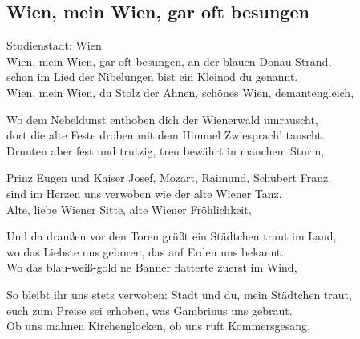 
\subsection*{Wien, mein Wien, gar oft besungen}
%
%
%
\nopagebreak
\hfill%
Studienstadt: Wien\\
%
\nopagebreak
\thestrophe Wien, mein Wien, gar oft besungen, an der blauen Donau Strand, \\
schon im Lied der Nibelungen bist ein Kleinod du genannt. \\
Wien, mein Wien, du Stolz der Ahnen, schönes Wien, demantengleich, \\

\thestrophe Wo dem Nebeldunst enthoben dich der Wienerwald umrauscht,\\
dort die alte Feste droben mit dem Himmel Zwiesprach' tauscht. \\
Drunten aber fest und trutzig, treu bewährt in manchem Sturm, \\

\thestrophe Prinz Eugen und Kaiser Josef, Mozart, Raimund, Schubert Franz, \\
sind im Herzen uns verwoben wie der alte Wiener Tanz. \\
Alte, liebe Wiener Sitte, alte Wiener Fröhlichkeit, \\

\thestrophe Und da draußen vor den Toren grüßt ein Städtchen traut im Land, \\
wo das Liebste uns geboren, das auf Erden uns bekannt. \\
Wo das blau-weiß-gold'ne Banner flatterte zuerst im Wind, \\

\thestrophe So bleibt ihr uns stets verwoben: Stadt und du, mein Städtchen traut, \\
euch zum Preise sei erhoben, was Gambrinus uns gebraut. \\
Ob uns mahnen Kirchenglocken, ob uns ruft Kommersgesang, \\
